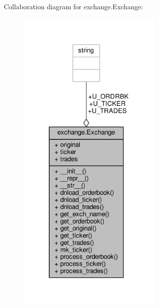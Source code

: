 Collaboration diagram for exchange.\+Exchange\+:
\nopagebreak
\begin{figure}[H]
\begin{center}
\leavevmode
\includegraphics[width=203pt]{classexchange_1_1_exchange__coll__graph}
\end{center}
\end{figure}
